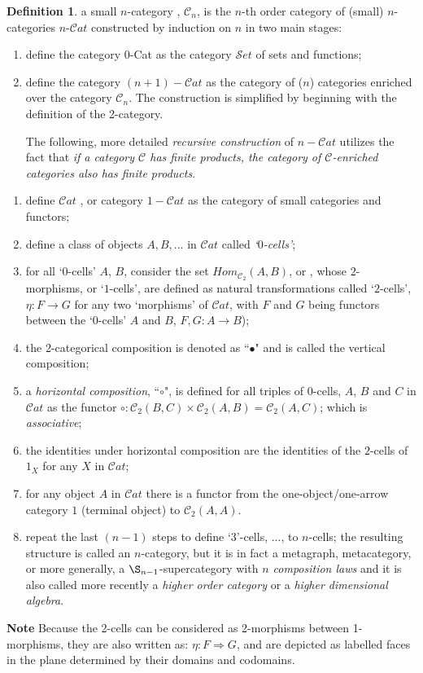 \documentclass[12pt]{article}
\theoremstyle{plain}
\theoremstyle{definition}
\newtheorem{definition}{Definition}[section]
\numberwithin{equation}{section}
\begin{document}
\begin{definition} a small $n$-category , $\mathcal{C}_n$, is the $n$-th order category 
of (small) $n$-categories $n$-$\mathcal{C}at$ constructed by induction on $n$ in two main stages:
\begin{enumerate}
\item define the category $0$-Cat as the category $\mathcal{S}et$ of sets and functions;
 
\item define the category $(n+1)-\mathcal{C}at$ as the category of ($n$) categories enriched over the category 
$\mathcal{C}_n$. The construction is simplified by beginning with the definition of the 2-category.
 
The following, more detailed \emph{recursive construction} of $n-\mathcal{C}at$ utilizes the fact that \emph{if a category $\mathcal{C}$ has finite products, the category of $\mathcal{C}$-enriched categories also has finite products}.

\end{enumerate}

\begin{enumerate}
\item define $\mathcal{C}at$ , or category $1-\mathcal{C}at$ as the category of small categories and functors;
\item define a class of objects $A, B,...$ in $\mathcal{C}at$ called \emph{`$0$-cells'};
\item for all `$0$-cells' $A$, $B$, consider the set $Hom_{\mathcal{C}_2}(A, B)$, or 
, whose $2$-morphisms, or `$1$-cells', are defined as natural transformations called `$2$-cells', $\eta: F \to G$ for any two `morphisms' of $\mathcal{C}at$, with $F$ and $G$ being functors between the `$0$-cells' $A$ and $B$, $F,G: A \to B$);
\item the 2-categorical composition is denoted as ``$ \bullet$" and is called the vertical composition;
\item a \emph{horizontal composition}, ``$\circ$", is defined for all triples of $0$-cells, $A$, $B$ and
$C$ in $\mathcal{C}at$ as the functor $\circ: \mathcal{C}_2(B,C) \times \mathcal{C}_2(A,B) = \mathcal{C}_2(A,C)$;
which is \emph{associative};
\item  the identities under horizontal composition are the identities of the $2$-cells of $1_X$ for any $X$ in $\mathcal{C}at$;
\item for any object $A$ in $\mathcal{C}at$ there is a functor from the one-object/one-arrow category \textbf{$1$} (terminal object) to $\mathcal{C}_2(A,A)$. 
\item repeat the last $(n-1)$ steps to define `3'-cells, ..., to $n$-cells; the resulting structure is called an $n$-category, but it is in fact a metagraph, metacategory, or more generally, a $\S_{n-1}$-supercategory with \emph{$n$ composition laws} and it is also called more recently a \emph{higher order category} or a \emph{higher dimensional algebra}.
\end{enumerate}
\end{definition}

\textbf{Note} Because the 2-cells can be considered as 2-morphisms between 1-morphisms, they are also written as: $\eta : F \Rightarrow G$, and are depicted as labelled faces in the plane determined by their domains and codomains.
\end{document}
